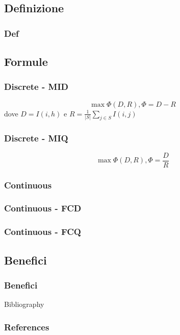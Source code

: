 \documentclass{beamer}
\begin{document}
\subsection{Definizione}
\begin{frame}
	\frametitle{Def}
\end{frame}

\subsection{Formule}
\begin{frame}
	\frametitle{Discrete - MID}
	$$\max \Phi(D,R), \Phi = D - R$$
	dove $D=I(i,h)$ e $R=\frac{1}{|S|}\sum\limits_{j \in S}I(i,j)$
\end{frame}

\begin{frame}
	\frametitle{Discrete - MIQ}
	$$\max \Phi(D,R), \Phi = \frac{D}{R}$$
\end{frame}
\begin{frame}
	\frametitle{Continuous}
\end{frame}
\begin{frame}
	\frametitle{Continuous - FCD}
\end{frame}

\begin{frame}
	\frametitle{Continuous - FCQ}
\end{frame}

\subsection{Benefici}
\begin{frame}
	\frametitle{Benefici}
\end{frame}

\begin{frame}{Bibliography}
	\frametitle{References}
	
	
\end{frame}
\end{document}
